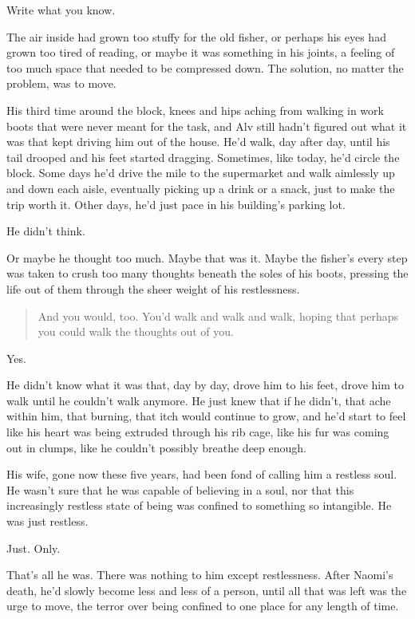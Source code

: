 Write what you know.

The air inside had grown too stuffy for the old fisher, or perhaps his eyes had grown too tired of reading, or maybe it was something in his joints, a feeling of too much space that needed to be compressed down. The solution, no matter the problem, was to move.

His third time around the block, knees and hips aching from walking in work boots that were never meant for the task, and Alv still hadn't figured out what it was that kept driving him out of the house. He'd walk, day after day, until his tail drooped and his feet started dragging. Sometimes, like today, he'd circle the block. Some days he'd drive the mile to the supermarket and walk aimlessly up and down each aisle, eventually picking up a drink or a snack, just to make the trip worth it. Other days, he'd just pace in his building's parking lot.

He didn't think.

Or maybe he thought too much. Maybe that was it. Maybe the fisher's every step was taken to crush too many thoughts beneath the soles of his boots, pressing the life out of them through the sheer weight of his restlessness.

\begin{quote}
And you would, too. You'd walk and walk and walk, hoping that perhaps you could walk the thoughts out of you.
\end{quote}

Yes.

He didn't know what it was that, day by day, drove him to his feet, drove him to walk until he couldn't walk anymore. He just knew that if he didn't, that ache within him, that burning, that itch would continue to grow, and he'd start to feel like his heart was being extruded through his rib cage, like his fur was coming out in clumps, like he couldn't possibly breathe deep enough.

His wife, gone now these five years, had been fond of calling him a restless soul. He wasn't sure that he was capable of believing in a soul, nor that this increasingly restless state of being was confined to something so intangible. He was just restless.

Just. Only.

That's all he was. There was nothing to him except restlessness. After Naomi's death, he'd slowly become less and less of a person, until all that was left was the urge to move, the terror over being confined to one place for any length of time.

